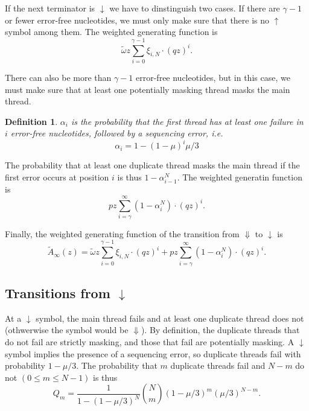 \documentclass{article}
\newtheorem{definition}{Definition}
\begin{document}
If the next terminator is $\downarrow$ we have to dinstinguish two cases.
If there are $\gamma-1$ or fewer error-free nucleotides, we must only make
sure that there is no $\uparrow$ symbol among them. The weighted
generating function is
\begin{equation}
\tilde{\omega} z \sum_{i=0}^{\gamma-1} \xi_{i,N} \cdot (qz)^i.
\end{equation}

There can also be more than $\gamma-1$ error-free nucleotides, but in this
case, we must make sure that at least one potentially masking thread masks
the main thread.

\begin{definition}
$\alpha_i$ is the probability that the first thread has at least one
failure in $i$ error-free nucleotides, followed by a sequencing error,
\textit{i.e.}
\begin{equation}
\alpha_i = 1 - (1-\mu)^i\mu/3
\end{equation}
\end{definition}

The probability that at least one duplicate thread masks the main thread
if the first error occurs at position $i$ is thus $1 - \alpha_{i-1}^N$.
The weighted generatin function is
\begin{equation}
pz\sum_{i=\gamma}^\infty (1 - \alpha_i^N) \cdot (qz)^i.
\end{equation}

Finally, the weighted generating function of the transition from
$\Downarrow$ to $\downarrow$ is
\begin{equation}
\tilde{A}_\infty(z) =
\tilde{\omega} z \sum_{i=0}^{\gamma-1} \xi_{i,N} \cdot (qz)^i +
pz\sum_{i=\gamma}^\infty (1 - \alpha_i^N) \cdot (qz)^i.
\end{equation}

\subsection{Transitions from $\downarrow$}
\label{sec:trans_from_down}

At a $\downarrow$ symbol, the main thread fails and at least one duplicate
thread does not (othwerwise the symbol would be $\Downarrow$). By
definition, the duplicate threads that do not fail are strictly masking,
and those that fail are potentially masking. A $\downarrow$ symbol implies
the presence of a sequencing error, so duplicate threads fail with
probability $1-\mu/3$. The probability that $m$ duplicate threads fail and
$N-m$ do not $(0 \leq m \leq N-1)$ is thus
\begin{equation}
  Q_m = \frac{1}{1-(1-\mu/3)^N}{N \choose m} (1-\mu/3)^m(\mu/3)^{N-m}.
\end{equation}
\end{document}
